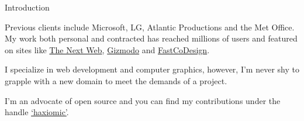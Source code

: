 \documentclass{resume} %
\begin{document}
\begin{rSection}{Introduction}
\item Previous clients include Microsoft, LG, Atlantic Productions and the Met Office. My work both personal and contracted has reached millions of users and featured on sites like \href{http://thenextweb.com/creativity/2015/05/15/webgl-fluid-experiment-is-a-browser-based-lsd-trip/}{The Next Web}, \href{http://www.gizmodo.co.uk/2014/11/just-try-and-stop-playing-with-this-fluid-simulator/}{Gizmodo} and \href{http://www.fastcodesign.com/3038725/this-wonderful-web-toy-turns-your-browser-into-magic-liquid}{FastCoDesign}.

\item I specialize in web development and computer graphics, however, I'm never shy to grapple with a new domain to meet the demands of a project.

\item I'm an advocate of open source and you can find my contributions under the handle \href{http://github.com/haxiomic}{`haxiomic'}.

\end{rSection}

\end{document}
